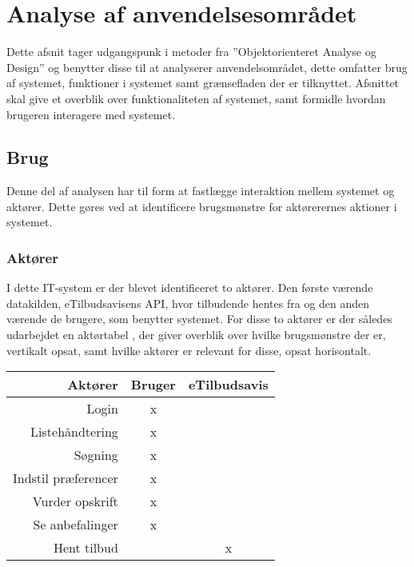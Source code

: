 \section{Analyse af anvendelsesområdet}
Dette afsnit tager udgangspunk i metoder fra ''Objektorienteret Analyse og Design'' og benytter disse til at analyserer anvendelsområdet, dette omfatter brug af systemet, funktioner i systemet samt grænsefladen der er tilknyttet.\citep{OOA&D2001} 
Afsnittet skal give et overblik over funktionaliteten af systemet, samt formidle hvordan brugeren interagere med systemet.

\subsection{Brug}
Denne del af analysen har til form at fastlægge interaktion mellem systemet og aktører.
Dette gøres ved at identificere brugsmønstre for aktørerernes aktioner i systemet.
\subsubsection*{Aktører}
I dette IT-system er der blevet identificeret to aktører. 
Den første værende datakilden, eTilbudsavisens API, hvor tilbudende hentes fra og den anden værende de brugere, som benytter systemet.
For disse to aktører er der således udarbejdet en aktørtabel , der giver overblik over hvilke brugsmønstre der er, vertikalt opsat, samt hvilke aktører er relevant for disse, opsat horisontalt.

\begin{table}[h]
\begin{tabular}{r|cc}
\hline
\textbf{Aktører}    & Bruger               & eTilbudsavis         \\ \hline
Login               & x                    & \multicolumn{1}{l}{} \\
Listehåndtering     & x                    & \multicolumn{1}{l}{} \\
Søgning             & x                    & \multicolumn{1}{l}{} \\
Indstil præferencer & x                    &                      \\
Vurder opskrift     & x                    &                      \\
Se anbefalinger     & x                    &                      \\
Hent tilbud         & \multicolumn{1}{l}{} & x                    \\ \hline
\end{tabular}
\end{table}\caption{Aktørtabel for systemet}\label{aktortabel}

